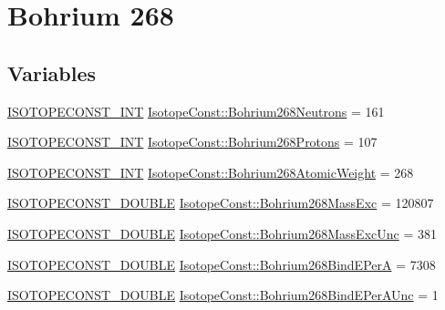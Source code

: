 \hypertarget{group___isotope_const-_bohrium-_bh268}{}\section{Bohrium 268}
\label{group___isotope_const-_bohrium-_bh268}
\subsection*{Variables}
\begin{DoxyCompactItemize}
\item 
\mbox{\hyperlink{group___isotope_const-_macros_ga5f18360b3e99483a35c32d789e62621c}{I\+S\+O\+T\+O\+P\+E\+C\+O\+N\+S\+T\+\_\+\+I\+NT}} \mbox{\hyperlink{group___isotope_const-_bohrium-_bh268_gafd71fa13d8c1ffe6fc7794f1a0b93067}{Isotope\+Const\+::\+Bohrium268\+Neutrons}} = 161
\item 
\mbox{\hyperlink{group___isotope_const-_macros_ga5f18360b3e99483a35c32d789e62621c}{I\+S\+O\+T\+O\+P\+E\+C\+O\+N\+S\+T\+\_\+\+I\+NT}} \mbox{\hyperlink{group___isotope_const-_bohrium-_bh268_ga3b66ca99e9c875110b9afecc93286ae6}{Isotope\+Const\+::\+Bohrium268\+Protons}} = 107
\item 
\mbox{\hyperlink{group___isotope_const-_macros_ga5f18360b3e99483a35c32d789e62621c}{I\+S\+O\+T\+O\+P\+E\+C\+O\+N\+S\+T\+\_\+\+I\+NT}} \mbox{\hyperlink{group___isotope_const-_bohrium-_bh268_ga55dde9f82434b9906305d31cb42490d0}{Isotope\+Const\+::\+Bohrium268\+Atomic\+Weight}} = 268
\item 
\mbox{\hyperlink{group___isotope_const-_macros_ga8f45a7272ce02c0b4c65c44636ed719a}{I\+S\+O\+T\+O\+P\+E\+C\+O\+N\+S\+T\+\_\+\+D\+O\+U\+B\+LE}} \mbox{\hyperlink{group___isotope_const-_bohrium-_bh268_ga872d9cf2cdcecc16304b49164cf3e961}{Isotope\+Const\+::\+Bohrium268\+Mass\+Exc}} = 120807
\item 
\mbox{\hyperlink{group___isotope_const-_macros_ga8f45a7272ce02c0b4c65c44636ed719a}{I\+S\+O\+T\+O\+P\+E\+C\+O\+N\+S\+T\+\_\+\+D\+O\+U\+B\+LE}} \mbox{\hyperlink{group___isotope_const-_bohrium-_bh268_gafaae9748908cd6326530283173cff7fe}{Isotope\+Const\+::\+Bohrium268\+Mass\+Exc\+Unc}} = 381
\item 
\mbox{\hyperlink{group___isotope_const-_macros_ga8f45a7272ce02c0b4c65c44636ed719a}{I\+S\+O\+T\+O\+P\+E\+C\+O\+N\+S\+T\+\_\+\+D\+O\+U\+B\+LE}} \mbox{\hyperlink{group___isotope_const-_bohrium-_bh268_ga1cd50e84fbe492afb450262504402d92}{Isotope\+Const\+::\+Bohrium268\+Bind\+E\+PerA}} = 7308
\item 
\mbox{\hyperlink{group___isotope_const-_macros_ga8f45a7272ce02c0b4c65c44636ed719a}{I\+S\+O\+T\+O\+P\+E\+C\+O\+N\+S\+T\+\_\+\+D\+O\+U\+B\+LE}} \mbox{\hyperlink{group___isotope_const-_bohrium-_bh268_ga9b7547d05456773177743bc1e0cd87f1}{Isotope\+Const\+::\+Bohrium268\+Bind\+E\+Per\+A\+Unc}} = 1

\end{DoxyCompactItemize}
